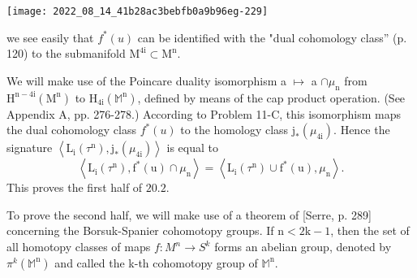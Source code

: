 \documentclass[10pt]{article}
\begin{document}
\texttt{[image: 2022\_08\_14\_41b28ac3bebfb0a9b96eg-229]}

we see easily that $f^{*}(u)$ can be identified with the "dual cohomology class'' (p. 120) to the submanifold $\mathrm{M}^{4 \mathrm{i}} \subset \mathrm{M}^{\mathrm{n}}$.

We will make use of the Poincare duality isomorphism a $\mapsto$ a $\cap \mu_{\mathrm{n}}$ from $\mathrm{H}^{\mathrm{n}-4 \mathrm{i}}\left(\mathrm{M}^{\mathrm{n}}\right)$ to $\mathrm{H}_{4 \mathrm{i}}\left(\mathbb{M}^{\mathrm{n}}\right)$, defined by means of the cap product operation. (See Appendix A, pp. 276-278.) According to Problem 11-C, this isomorphism maps the dual cohomology class $f^{*}(u)$ to the homology class $\mathrm{j}_{*}\left(\mu_{4 \mathrm{i}}\right)$. Hence the signature $\left\langle\mathrm{L}_{\mathrm{i}}\left(\tau^{\mathrm{n}}\right), \mathrm{j}_{*}\left(\mu_{4 \mathrm{i}}\right)\right\rangle$ is equal to
$$
\left\langle\mathrm{L}_{\mathrm{i}}\left(\tau^{\mathrm{n}}\right), \mathrm{f}^{*}(\mathrm{u}) \cap \mu_{\mathrm{n}}\right\rangle=\left\langle\mathrm{L}_{\mathrm{i}}\left(\tau^{\mathrm{n}}\right) \cup \mathrm{f}^{*}(\mathrm{u}), \mu_{\mathrm{n}}\right\rangle .
$$
This proves the first half of $20.2$.

To prove the second half, we will make use of a theorem of [Serre, p. 289] concerning the Borsuk-Spanier cohomotopy groups. If $\mathrm{n}<2 \mathrm{k}-1$, then the set of all homotopy classes of maps $f: M^{n} \rightarrow S^{k}$ forms an abelian group, denoted by $\pi^{k}\left(\mathbb{M}^{\mathrm{n}}\right)$ and called the k-th cohomotopy group of $\mathbb{M}^{\mathrm{n}}$.
\end{document}
